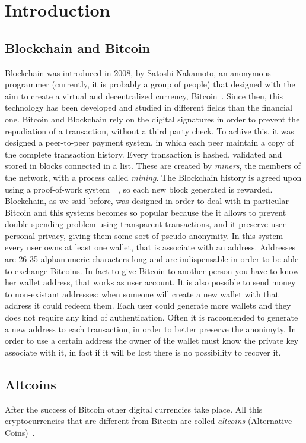 \section{Introduction}

\subsection{Blockchain and Bitcoin}
Blockchain was introduced in 2008, by Satoshi Nakamoto, an anonymous programmer
(currently, it is probably a group of people) that designed with the aim to
create a virtual and decentralized currency, Bitcoin~\cite{satoshi}. Since
then, this technology has been developed and studied in different fields than
the financial one. Bitcoin and Blockchain rely on the digital signatures in
order to prevent the repudiation of a transaction, without a third party check.
To achive this, it was designed a peer-to-peer payment system, in which each
peer maintain a copy of the complete transaction history. Every transaction is
hashed, validated and stored in blocks connected in a list. These are created
by \textit{miners}, the members of the network, with a process called
\textit{mining}. The Blockchain history is agreed upon using a proof-of-work
system~\cite{pricing}~\cite{hashcash}, so each new block generated is rewarded.
Blockchain, as we said before, was designed in order to deal with
in particular Bitcoin and this systems becomes so popular because the it allows
to prevent double spending problem using transparent transactions, and it
preserve user personal privacy, giving them some sort of pseudo-anonymity.
In this system every user owns at least one wallet, that is associate with an
address. Addresses are 26-35 alphanumeric characters long and are indispensable
in order to be able to exchange Bitcoins. In fact to give Bitcoin to another
person you have to know her wallet address, that works as user account. It is
also possible to send money to non-existant addresses: when someone will create
a new wallet with that address it could redeem them. Each user could generate
more wallets and they does not require any kind of authentication. Often it is
raccomended to generate a new address to each transaction, in order to better
preserve the anonimyty\cite{satoshi}. In order to use a certain address the
owner of the wallet must know the private key associate with it, in fact if it
will be lost there is no possibility to recover it. 


\subsection{Altcoins}
After the success of Bitcoin other digital currencies take place. All this
cryptocurrencies that are different from Bitcoin are colled \textit{altcoins}
(Alternative Coins)~\cite{bitcoinbeyond}.



